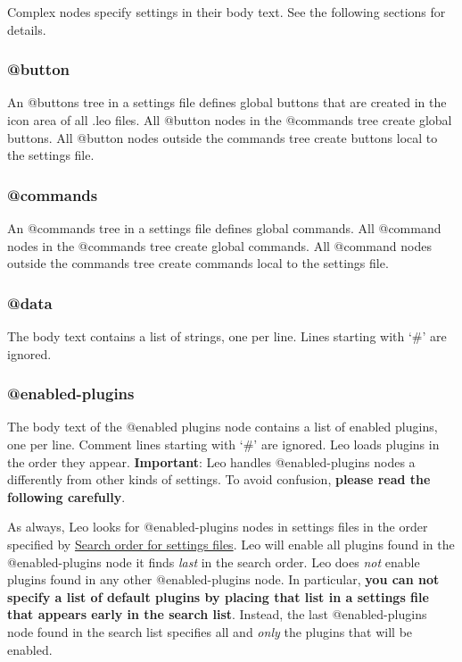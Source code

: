 \documentclass[a4paper,10pt,english]{sphinxmanual}
\begin{document}
Complex nodes specify settings in their body text.
See the following sections for details.


\subsubsection{@button}
\label{customizing:button}
An @buttons tree in a settings file defines global buttons that
are created in the icon area of all .leo files.
All @button nodes in the @commands tree create global buttons.
All @button nodes outside the commands tree create buttons local to the settings file.


\subsubsection{@commands}
\label{customizing:commands}
An @commands tree in a settings file defines global commands.
All @command nodes in the @commands tree create global commands.
All @command nodes outside the commands tree create commands local to the settings file.


\subsubsection{@data}
\label{customizing:data}
The body text contains a list of strings, one per line.
Lines starting with `\#' are ignored.


\subsubsection{@enabled-plugins}
\label{customizing:enabled-plugins}
The body text of the @enabled plugins node contains a list of enabled plugins,
one per line. Comment lines starting with `\#' are ignored. Leo loads plugins in
the order they appear.
\textbf{Important}: Leo handles @enabled-plugins nodes a differently from other kinds
of settings. To avoid confusion, \textbf{please read the following carefully}.

As always, Leo looks for @enabled-plugins nodes in settings files in the order
specified by {\hyperref[customizing:search-order-for-settings-files]{Search order for settings files}}. Leo will enable all plugins
found in the @enabled-plugins node it finds \emph{last} in the search order. Leo does
\emph{not} enable plugins found in any other @enabled-plugins node. In particular,
\textbf{you can not specify a list of default plugins by placing that list in a
settings file that appears early in the search list}. Instead, the last
@enabled-plugins node found in the search list specifies all and \emph{only} the plugins
that will be enabled.
\end{document}
